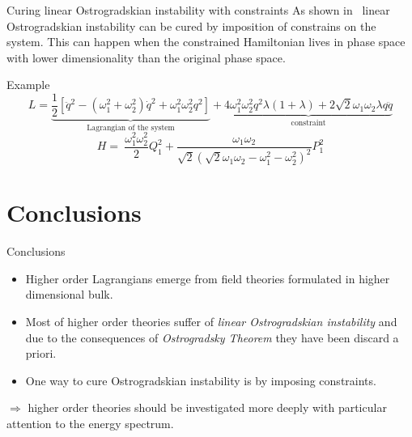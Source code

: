 \documentclass[10pt]{beamer}
\begin{document}
  \begin{frame}{Curing linear Ostrogradskian instability with constraints}
    As shown in~\cite{Chen13} linear Ostrogradskian instability can be cured by
    imposition of constrains on the system. This can happen when the constrained
    Hamiltonian lives in phase space with lower dimensionality than the original
    phase space. \vspace{1.0em}
    \begin{block}{Example}
      \vspace{0.2em}
      \begin{equation*}
        L =
        \underbrace{
          \frac{1}{2} \left[
          \ddot{q}^2 - (\omega_1^2 + \omega_2^2) \dot{q}^2 +
          \omega_1^2 \omega_2^2 q^2 \right]
        }_{\text{Lagrangian of the system}} +
        \underbrace{
          4 \omega_1^2\omega_2^2 q^2 \lambda (1+ \lambda) +
          2 \sqrt{2} \omega_1\omega_2 \lambda q \ddot{q}
        }_{\text{constraint}}
      \end{equation*}
      \vspace{0.2em}
      \begin{equation*}
        H =\ \frac{\omega_1^2\omega_2^2}{2} Q_1^2 +
        \frac{\omega_1\omega_2}{\sqrt{2} {\left(\sqrt{2} \omega_1\omega_2 -
        \omega_1^2 - \omega_2^2 \right)}^2} P_1^2
      \end{equation*}
    \end{block}
  \end{frame}

  \section{Conclusions}

  \begin{frame}{Conclusions}
    \begin{itemize}
      \item Higher order Lagrangians emerge from field theories formulated in
        higher dimensional bulk. \vspace{0.5em}
      \item Most of higher order theories suffer of \emph{linear Ostrogradskian
        instability} and due to the consequences of \emph{Ostrogradsky Theorem}
        they have been discard a priori. \vspace{0.5em}
      \item One way to cure Ostrogradskian instability is by imposing
        constraints.
    \end{itemize} \vspace{1.0em}
    $\Rightarrow$ higher order theories should be investigated more
    deeply with particular attention to the energy spectrum.
  \end{frame}
\end{document}
